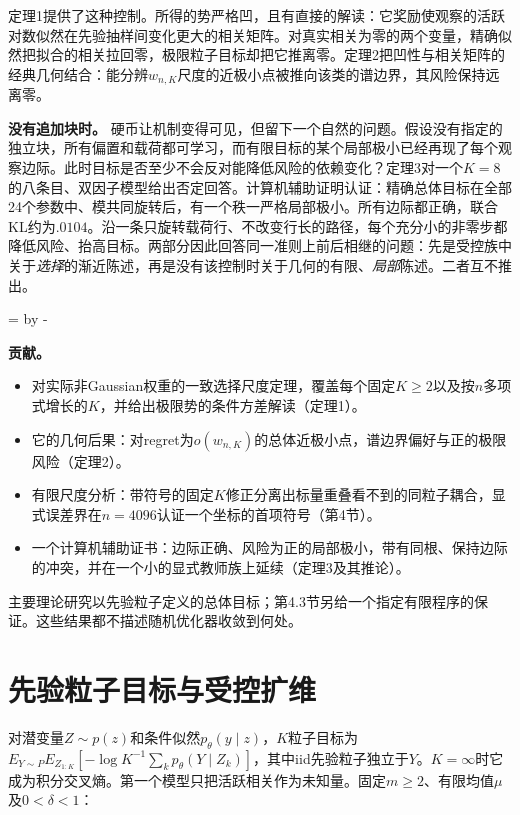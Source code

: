 \documentclass[11pt,a4paper]{article}
\providecommand{\tightlist}{\setlength{\itemsep}{0pt}\setlength{\parskip}{0pt}}
\begin{document}
定理1提供了这种控制。所得的势严格凹，且有直接的解读：它奖励使观察的活跃对数似然在先验抽样间变化更大的相关矩阵。对真实相关为零的两个变量，精确似然把拟合的相关拉回零，极限粒子目标却把它推离零。定理2把凹性与相关矩阵的经典几何结合：能分辨\(w_{n,K}\)尺度的近极小点被推向该类的谱边界，其风险保持远离零。

\textbf{没有追加块时。}
硬币让机制变得可见，但留下一个自然的问题。假设没有指定的独立块，所有偏置和载荷都可学习，而有限目标的某个局部极小已经再现了每个观察边际。此时目标是否至少不会反对能降低风险的依赖变化？定理3对一个\(K=8\)的八条目、双因子模型给出否定回答。计算机辅助证明认证：精确总体目标在全部24个参数中、模共同旋转后，有一个秩一严格局部极小。所有边际都正确，联合KL约为\(.0104\)。沿一条只旋转载荷行、不改变行长的路径，每个充分小的非零步都降低风险、抬高目标。两部分因此回答同一准则上前后相继的问题：先是受控族中关于\emph{选择}的渐近陈述，再是没有该控制时关于几何的有限、\emph{局部}陈述。二者互不推出。

\par{}=\pagegoal\advance{} by -\pagetotal\ifdim\dimen0<6\baselineskip\newpage\fi

\textbf{贡献。}

\begin{itemize}
\tightlist
\item
  对实际非Gaussian权重的一致选择尺度定理，覆盖每个固定\(K\ge2\)以及按\(n\)多项式增长的\(K\)，并给出极限势的条件方差解读（定理1）。
\item
  它的几何后果：对regret为\(o(w_{n,K})\)的总体近极小点，谱边界偏好与正的极限风险（定理2）。
\item
  有限尺度分析：带符号的固定\(K\)修正分离出标量重叠看不到的同粒子耦合，显式误差界在\(n=4096\)认证一个坐标的首项符号（第4节）。
\item
  一个计算机辅助证书：边际正确、风险为正的局部极小，带有同根、保持边际的冲突，并在一个小的显式教师族上延续（定理3及其推论）。
\end{itemize}

主要理论研究以先验粒子定义的总体目标；第4.3节另给一个指定有限程序的保证。这些结果都不描述随机优化器收敛到何处。

\section{先验粒子目标与受控扩维}\label{ux5148ux9a8cux7c92ux5b50ux76eeux6807ux4e0eux53d7ux63a7ux6269ux7ef4}

对潜变量\(Z\sim p(z)\)和条件似然\(p_\theta(y\mid z)\)，\(K\)粒子目标为\(E_{Y\sim P}E_{Z_{1:K}}[-\log K^{-1}\sum_kp_\theta(Y\mid Z_k)]\)，其中iid先验粒子独立于\(Y\)。\(K=\infty\)时它成为积分交叉熵。第一个模型只把活跃相关作为未知量。固定\(m\ge2\)、有限均值\(\mu\)及\(0<\delta<1\)：
\end{document}
